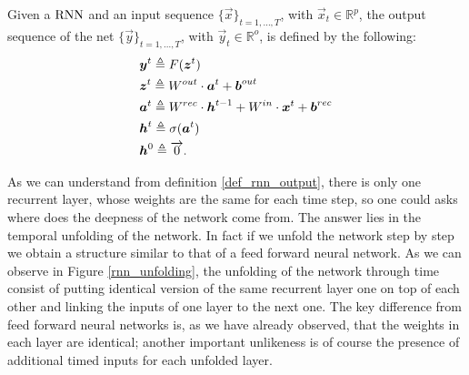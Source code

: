 \begin{defn}
\label{def_rnn_output}
Given a $\mathrm{RNN}$ and an input sequence $\{\vec{x}\}_{t=1,...,T}$, with $ \vec{x}_t \in \mathbb{R}^p$, the output sequence of the net $\{\vec{y}\}_{t=1,...,T}$, with $\vec{y}_t \in \mathbb{R}^o$,  is defined by the following:
\begin{align}
&\boldsymbol{y}^t \triangleq F(\boldsymbol{z}^t)\\
&\boldsymbol{z}^t \triangleq W^{out}\cdot\boldsymbol{a}^t + \boldsymbol{b}^{out}\\
&\boldsymbol{a}^t \triangleq W^{rec}\cdot\boldsymbol{h}^{t-1}+W^{in}\cdot\boldsymbol{x}^t+\boldsymbol{b}^{rec}\\
&\boldsymbol{h}^t \triangleq  \sigma(\boldsymbol{a}^t) \\
&\boldsymbol{h}^0 \triangleq \overrightarrow{0}.
\end{align}
\end{defn}
As we can understand from definition \ref{def_rnn_output}, there is only one recurrent layer, whose weights are the same for each time step, so one could asks where does the deepness of the network come from.
The answer lies in the temporal unfolding of the network. In fact if we unfold the network step by step we obtain a structure similar to that of a feed forward neural network. As we can observe
in Figure \ref{rnn_unfolding}, the unfolding of the network through time consist of putting identical version of the same recurrent layer one on top of each other and linking the inputs of one layer to the
next one. The key difference from feed forward neural networks is, as we have already observed, that the weights in each layer are identical; another
important unlikeness is of course the presence of additional timed inputs for each unfolded layer.

